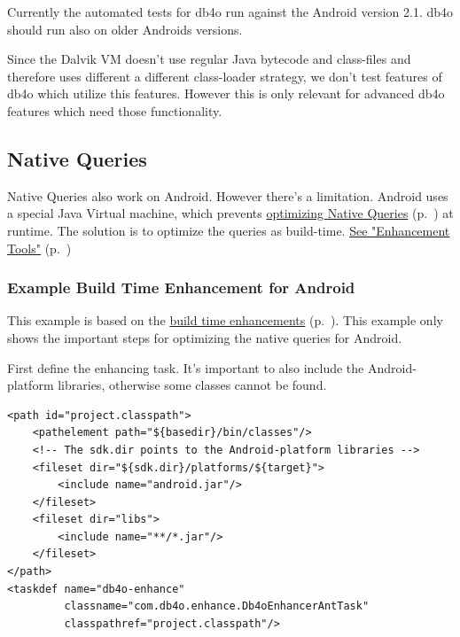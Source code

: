 Currently the automated tests for db4o run against the Android version 2.1. db4o should run also on older Androids versions.

Since the Dalvik VM doesn't use regular Java bytecode and class-files and therefore uses different a different class-loader strategy, we don't test features of db4o which utilize this features. However this is only relevant for advanced db4o features which need those functionality.

\subsection{Native Queries}
\label{ref:platform-specific-issues-android-native-queries}

Native Queries also work on Android. However there's a limitation. Android uses a special Java Virtual machine, which prevents \hyperref[ref:basics-querying-native-queries-native-query-optimization]{optimizing Native Queries} (p.~\pageref{ref:basics-querying-native-queries-native-query-optimization}) at runtime. The solution is to optimize the queries as build-time. \hyperref[ref:advanced-topics-enhancement-tools]{See "Enhancement Tools"} (p.~\pageref{ref:advanced-topics-enhancement-tools})

\subsubsection*{Example Build Time Enhancement for Android}

This example is based on the \hyperref[ref:advanced-topics-enhancement-tools-enhancement-for-java-build-time-enhancement]{build time enhancements} (p.~\pageref{ref:advanced-topics-enhancement-tools-enhancement-for-java-build-time-enhancement}). This example only shows the important steps for optimizing the native queries for Android.

First define the enhancing task. It's important to also include the Android-platform libraries, otherwise some classes cannot be found.

\begin{lstlisting}
<path id="project.classpath">
    <pathelement path="${basedir}/bin/classes"/>
    <!-- The sdk.dir points to the Android-platform libraries -->
    <fileset dir="${sdk.dir}/platforms/${target}">
        <include name="android.jar"/>
    </fileset>
    <fileset dir="libs">
        <include name="**/*.jar"/>
    </fileset>
</path>
<taskdef name="db4o-enhance"
         classname="com.db4o.enhance.Db4oEnhancerAntTask"
         classpathref="project.classpath"/>
\end{lstlisting}

